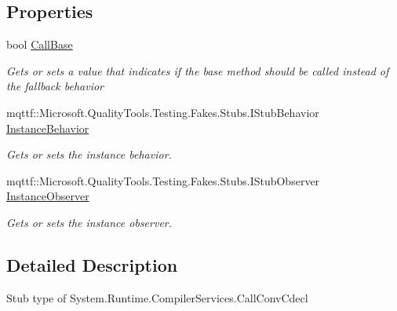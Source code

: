 \subsection*{Properties}
\begin{DoxyCompactItemize}
\item 
bool \hyperlink{class_system_1_1_runtime_1_1_compiler_services_1_1_fakes_1_1_stub_call_conv_cdecl_a758747192ade7c961d1d967770ce4e2c}{Call\-Base}
\begin{DoxyCompactList}\small\item\em Gets or sets a value that indicates if the base method should be called instead of the fallback behavior\end{DoxyCompactList}\item 
mqttf\-::\-Microsoft.\-Quality\-Tools.\-Testing.\-Fakes.\-Stubs.\-I\-Stub\-Behavior \hyperlink{class_system_1_1_runtime_1_1_compiler_services_1_1_fakes_1_1_stub_call_conv_cdecl_a738a75f0263bc425e76eb1b7b3dcb050}{Instance\-Behavior}
\begin{DoxyCompactList}\small\item\em Gets or sets the instance behavior.\end{DoxyCompactList}\item 
mqttf\-::\-Microsoft.\-Quality\-Tools.\-Testing.\-Fakes.\-Stubs.\-I\-Stub\-Observer \hyperlink{class_system_1_1_runtime_1_1_compiler_services_1_1_fakes_1_1_stub_call_conv_cdecl_a2a51cff04206a0828bcd6d77e3f7dcb7}{Instance\-Observer}
\begin{DoxyCompactList}\small\item\em Gets or sets the instance observer.\end{DoxyCompactList}\end{DoxyCompactItemize}


\subsection{Detailed Description}
Stub type of System.\-Runtime.\-Compiler\-Services.\-Call\-Conv\-Cdecl



